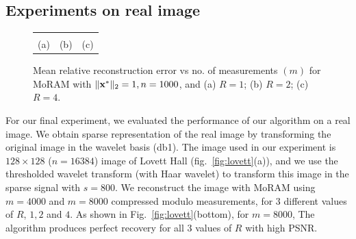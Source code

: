 \subsection{Experiments on real image}
\begin{figure}[!t]
	\begin{center}
		\begin{tabular}{ccc}
			
			&
			
			&
			 \\
			(a) & (b) & (c) \\
			
		\end{tabular}
	\end{center}
	\caption{{Mean relative reconstruction error vs no. of measurements $(m)$ for MoRAM with $\|\mathbf{x^*}\|_2=1,n=1000$, and (a) $R=1$; (b) $R=2$; (c) $R=4$.}}
	\label{fig:plot}
\end{figure}
For our final experiment, we evaluated the performance of our algorithm on a real image. We obtain sparse representation of the real image by transforming the original image in the wavelet basis (db1). The image used in our experiment is $128 \times 128$ ($n=16384$) image of Lovett Hall (fig.~\ref{fig:lovett}(a)), and  we use the thresholded wavelet transform (with Haar wavelet) to transform this image in the sparse signal with $s = 800$. We reconstruct the image with MoRAM using $m = 4000$ and $m=8000$ compressed modulo measurements, for $3$ different values of $R$, $1,2$ and $4$. As shown in Fig.~\ref{fig:lovett}(bottom), for $m=8000$, The algorithm produces perfect recovery for all $3$ values of $R$ with high PSNR.
%
